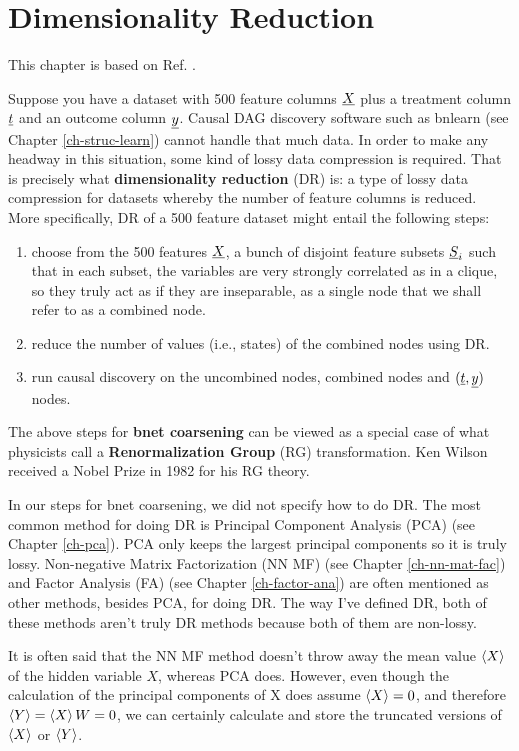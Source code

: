\chapter{Dimensionality Reduction}
\label{ch-dim-reduc}


This chapter is based on Ref. \cite{wiki-dim-reduc}.


Suppose you have a dataset with 500 feature columns ${\underline{X}}$ plus a treatment
column ${\underline{t}}$ and an outcome column ${\underline{y}}$.
Causal DAG discovery software such as  bnlearn (see Chapter \ref{ch-struc-learn}) 
cannot handle that much data.
In order to make any headway in this situation,
some kind of lossy data compression is required. That is precisely what {\bf dimensionality reduction} (DR) is: a type
of lossy data compression for datasets whereby the number of feature columns is reduced.
More specifically, DR of a 500 feature dataset might entail the 
following steps:
\begin{enumerate}

\item choose from the 500 features ${\underline{X}}$, a bunch of disjoint feature subsets ${\underline{S}}_i$ such that in each subset, the variables are very strongly correlated as in a clique, so they truly act as if they are inseparable, as a single node that we shall refer to as a combined node.

\item reduce the number of values (i.e., states) of the combined nodes using DR.

\item run causal discovery on the uncombined nodes, combined nodes and $({\underline{t}}, {\underline{y}})$
 nodes.
\end{enumerate}

The above steps for {\bf bnet  coarsening} can be
viewed as a special case of what physicists call a {\bf Renormalization Group} (RG) transformation. Ken Wilson received a Nobel Prize in 1982 for his RG theory.

In our steps for bnet coarsening,
we did not specify how to do DR. 
The most common
method for doing DR is
Principal Component Analysis (PCA)
(see Chapter \ref{ch-pca}). PCA 
only keeps the largest principal 
components so it is truly lossy. Non-negative Matrix Factorization (NN MF)
(see Chapter \ref{ch-nn-mat-fac})
and Factor Analysis (FA) (see Chapter \ref{ch-factor-ana})
are often mentioned as other
methods, besides PCA, for doing DR. The way I've
defined DR, both of these methods aren't truly DR methods because both of them are non-lossy.

It is often said that the NN MF method doesn't throw away the mean value $\left\langle X\right\rangle$ of the hidden variable $X$,
whereas PCA does. However, even though the calculation of the principal components of X
does assume $\left\langle X\right\rangle=0$, and therefore $\left\langle Y\right\rangle=\left\langle X\right\rangle W=0$, we can certainly calculate and store the truncated 
versions of $\left\langle X\right\rangle$ or $\left\langle Y\right\rangle$.
